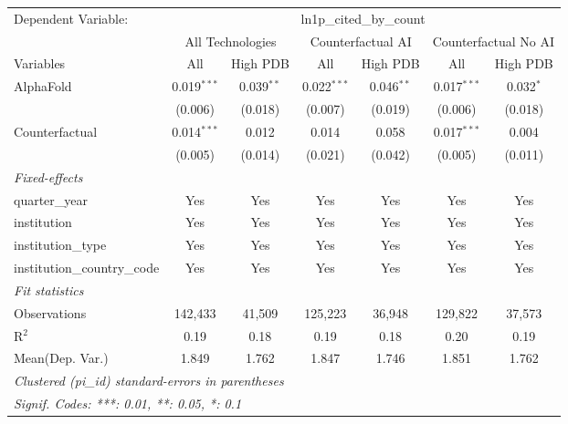\begingroup
\centering
\begin{tabular}{lcccccc}
   \tabularnewline \midrule \midrule
   Dependent Variable: & \multicolumn{6}{c}{ln1p\_cited\_by\_count}\\
 & \multicolumn{2}{c}{All Technologies} & \multicolumn{2}{c}{Counterfactual AI} & \multicolumn{2}{c}{Counterfactual No AI} \\
\cmidrule(lr){1-1}\cmidrule(lr){2-3} \cmidrule(lr){4-5} \cmidrule(lr){6-7}
Variables & \multicolumn{1}{c}{All} & \multicolumn{1}{c}{High PDB} & \multicolumn{1}{c}{All} & \multicolumn{1}{c}{High PDB} & \multicolumn{1}{c}{All} & \multicolumn{1}{c}{High PDB} \\
\cmidrule(lr){1-1}\cmidrule(lr){2-2} \cmidrule(lr){3-3} \cmidrule(lr){4-4} \cmidrule(lr){5-5} \cmidrule(lr){6-6} \cmidrule(lr){7-7}
   AlphaFold                    & 0.019$^{***}$ & 0.039$^{**}$ & 0.022$^{***}$ & 0.046$^{**}$ & 0.017$^{***}$ & 0.032$^{*}$\\   
                                & (0.006)       & (0.018)      & (0.007)       & (0.019)      & (0.006)       & (0.018)\\   
   Counterfactual               & 0.014$^{***}$ & 0.012        & 0.014         & 0.058        & 0.017$^{***}$ & 0.004\\   
                                & (0.005)       & (0.014)      & (0.021)       & (0.042)      & (0.005)       & (0.011)\\   
   \midrule
   \emph{Fixed-effects}\\
   quarter\_year                & Yes           & Yes          & Yes           & Yes          & Yes           & Yes\\  
   institution                  & Yes           & Yes          & Yes           & Yes          & Yes           & Yes\\  
   institution\_type            & Yes           & Yes          & Yes           & Yes          & Yes           & Yes\\  
   institution\_country\_code   & Yes           & Yes          & Yes           & Yes          & Yes           & Yes\\  
   \midrule
   \emph{Fit statistics}\\
   Observations                 & 142,433       & 41,509       & 125,223       & 36,948       & 129,822       & 37,573\\  
   R$^2$                        & 0.19          & 0.18         & 0.19          & 0.18         & 0.20          & 0.19\\  
Mean(Dep. Var.) & 1.849 & 1.762 & 1.847 & 1.746 & 1.851 & 1.762 \\
   \midrule \midrule
   \multicolumn{7}{l}{\emph{Clustered (pi\_id) standard-errors in parentheses}}\\
   \multicolumn{7}{l}{\emph{Signif. Codes: ***: 0.01, **: 0.05, *: 0.1}}\\
\end{tabular}
\par\endgroup
